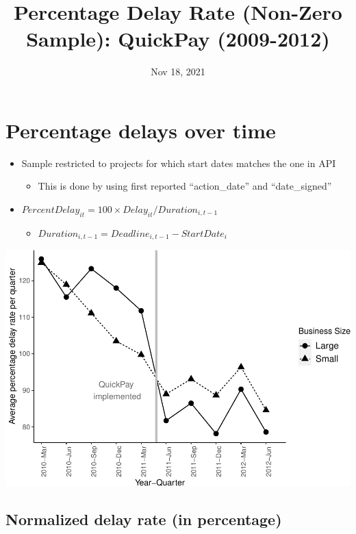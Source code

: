 \documentclass[
]{article}
\title{Percentage Delay Rate (Non-Zero Sample): QuickPay (2009-2012)}
\author{}
\date{\vspace{-2.5em}Nov 18, 2021}
\providecommand{\tightlist}{%
  \setlength{\itemsep}{0pt}\setlength{\parskip}{0pt}}
\begin{document}
\maketitle

\hypertarget{percentage-delays-over-time}{%
\section{Percentage delays over
time}\label{percentage-delays-over-time}}

\begin{itemize}
\tightlist
\item
  Sample restricted to projects for which start dates matches the one in
  API

  \begin{itemize}
  \tightlist
  \item
    This is done by using first reported ``action\_date'' and
    ``date\_signed''
  \end{itemize}
\item
  \(PercentDelay_{it}=100 \times Delay_{it}/Duration_{i,t-1}\)

  \begin{itemize}
  \tightlist
  \item
    \(Duration_{i,t-1} = Deadline_{i,t-1} - StartDate_i\)
  \end{itemize}
\end{itemize}

\includegraphics{qp_first_pc_delay_non_zero_files/figure-latex/plot_pc_delay-1.pdf}

\hypertarget{normalized-delay-rate-in-percentage}{%
\subsection{Normalized delay rate (in
percentage)}\label{normalized-delay-rate-in-percentage}}
\end{document}

